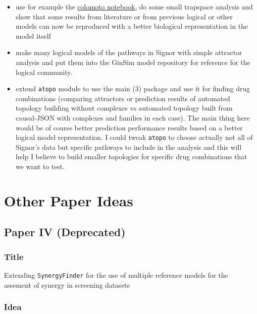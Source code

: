 \documentclass[12pt,]{book}
\providecommand{\tightlist}{%
  \setlength{\itemsep}{0pt}\setlength{\parskip}{0pt}}
\begin{document}
\begin{enumerate}
  \begin{itemize}
  \tightlist
  \item
    use for example the \href{https://github.com/colomoto/colomoto-docker}{colomoto notebook}, do some small trapspace analysis and show that some results from literature or from previous logical or other models can now be reproduced with a better biological representation in the model itself
  \item
    make many logical models of the pathways in Signor with simple attractor analysis and put them into the GinSim model repository for reference for the logical community.
  \item
    extend \texttt{atopo} module to use the main (3) package and use it for finding drug combinations (comparing attractors or prediction results of automated topology building without complexes vs automated topology built from causal-JSON with complexes and families in each case).
    The main thing here would be of course better prediction performance results based on a better logical model representation.
    I could tweak \texttt{atopo} to choose actually not all of Signor's data but specific pathways to include in the analysis and this will help I believe to build smaller topologies for specific drug combinations that we want to test.
  \end{itemize}
\end{enumerate}

\hypertarget{other-paper-ideas}{%
\section{Other Paper Ideas}\label{other-paper-ideas}}

\hypertarget{paper-iv-deprecated}{%
\subsection*{Paper IV (Deprecated)}\label{paper-iv-deprecated}}

\hypertarget{title}{%
\subsubsection*{Title}\label{title}}

Extending \texttt{SynergyFinder} for the use of multiple reference models for the assement of synergy in screening datasets

\hypertarget{idea-2}{%
\subsubsection*{Idea}\label{idea-2}}
\end{document}
